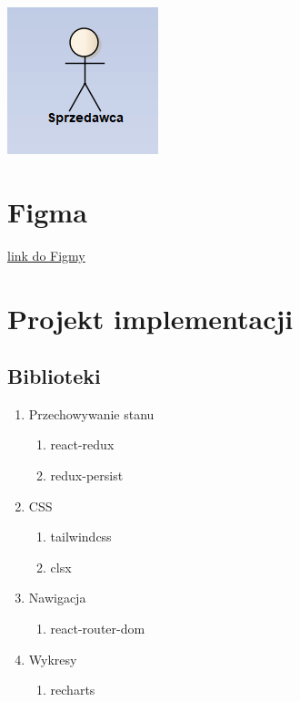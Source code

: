 \documentclass[a4paper,11pt]{article}
\begin{document}
\includegraphics[scale=0.5]{src/u8.png}\\

\section{Figma}
\href{https://www.figma.com/file/6HQmM9ssZsjX2jbWcm6bmN/PGUI_PANEL_SPRZEDAWCY?node-id=0%3A1&t=sC3RxEjXZwQHD2Ov-0}{link do Figmy}
\section{Projekt implementacji}
\subsection{Biblioteki}
\begin{enumerate}
    \item Przechowywanie stanu
    \begin{enumerate}
        \item react-redux
        \item redux-persist
    \end{enumerate}
    \item CSS
    \begin{enumerate}
        \item tailwindcss
        \item clsx
    \end{enumerate}
    \item Nawigacja
    \begin{enumerate}
        \item react-router-dom
    \end{enumerate}
    \item Wykresy
    \begin{enumerate}
        \item recharts
    \end{enumerate}
\end{enumerate}
\end{document}
